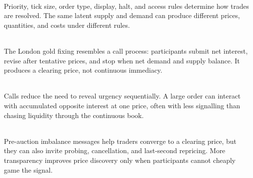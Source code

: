 \begin{marketrule} \\
Priority, tick size, order type, display, halt, and access rules determine how trades are resolved. The same latent supply and demand can produce different prices, quantities, and costs under different rules.
\end{marketrule}

\begin{casestudy} \\
The London gold fixing resembles a call process: participants submit net interest, revise after tentative prices, and stop when net demand and supply balance. It produces a clearing price, not continuous immediacy.
\end{casestudy}

\begin{practitionernote} \\
Calls reduce the need to reveal urgency sequentially. A large order can interact with accumulated opposite interest at one price, often with less signalling than chasing liquidity through the continuous book.
\end{practitionernote}

\begin{caveat} \\
Pre-auction imbalance messages help traders converge to a clearing price, but they can also invite probing, cancellation, and last-second repricing. More transparency improves price discovery only when participants cannot cheaply game the signal.
\end{caveat}
